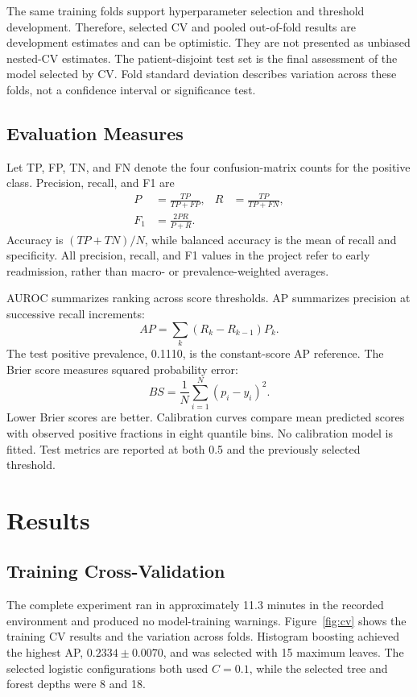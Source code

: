 \documentclass[conference]{IEEEtran}
\begin{document}
The same training folds support hyperparameter selection and threshold development. Therefore, selected CV and pooled out-of-fold results are development estimates and can be optimistic. They are not presented as unbiased nested-CV estimates. The patient-disjoint test set is the final assessment of the model selected by CV. Fold standard deviation describes variation across these folds, not a confidence interval or significance test.

\subsection{Evaluation Measures}
Let TP, FP, TN, and FN denote the four confusion-matrix counts for the positive class. Precision, recall, and F1 are
\begin{align}
P &= \frac{TP}{TP+FP}, & R &= \frac{TP}{TP+FN}, \\
F_1 &= \frac{2PR}{P+R}.
\end{align}
Accuracy is $(TP+TN)/N$, while balanced accuracy is the mean of recall and specificity. All precision, recall, and F1 values in the project refer to early readmission, rather than macro- or prevalence-weighted averages.

AUROC summarizes ranking across score thresholds. AP summarizes precision at successive recall increments:
\begin{equation}
AP = \sum_k (R_k-R_{k-1})P_k.
\end{equation}
The test positive prevalence, 0.1110, is the constant-score AP reference. The Brier score measures squared probability error:
\begin{equation}
BS = \frac{1}{N}\sum_{i=1}^{N}(p_i-y_i)^2.
\end{equation}
Lower Brier scores are better. Calibration curves compare mean predicted scores with observed positive fractions in eight quantile bins. No calibration model is fitted. Test metrics are reported at both 0.5 and the previously selected threshold.

\FloatBarrier
\section{Results}
\subsection{Training Cross-Validation}
The complete experiment ran in approximately 11.3 minutes in the recorded environment and produced no model-training warnings. Figure~\ref{fig:cv} shows the training CV results and the variation across folds. Histogram boosting achieved the highest AP, $0.2334\pm0.0070$, and was selected with 15 maximum leaves. The selected logistic configurations both used $C=0.1$, while the selected tree and forest depths were 8 and 18.
\end{document}
